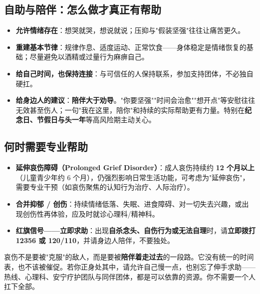 \subsection{自助与陪伴：怎么做才真正有帮助}

\begin{itemize}
	\item \textbf{允许情绪存在}：想哭就哭，想说就说；压抑与"假装坚强"往往让痛苦更久。
	\item \textbf{重建基本节律}：规律作息、适度运动、正常饮食——身体稳定是情绪恢复的基础；尽量避免以酒精或过量行为麻痹自己。
	\item \textbf{给自己时间，也保持连接}：与可信任的人保持联系，参加支持团体，不必独自硬扛。
	\item \textbf{给身边人的建议}：\textbf{陪伴大于劝导}。"你要坚强""时间会治愈""想开点"等安慰往往无效甚至伤人；一句"我在这里，陪你"和持续的实际帮助更有力量。特别在\textbf{纪念日、节假日与头一年}等高风险期主动关心。
\end{itemize}

\subsection{何时需要专业帮助}

\begin{itemize}
	\item \textbf{延伸哀伤障碍（Prolonged Grief Disorder）}：成人哀伤持续约 \textbf{12 个月以上}（儿童青少年约 6 个月），仍强烈影响日常生活功能，可考虑为"延伸哀伤"，需要专业干预（如哀伤聚焦的认知行为治疗、人际治疗）。
	\item \textbf{合并抑郁 / 创伤}：持续情绪低落、失眠、进食障碍、对一切失去兴趣，或出现创伤性再体验，应及时就诊心理科/精神科。
	\item \textbf{红旗信号——立即求助}：出现\textbf{自杀念头、自伤行为或无法自理}时，请\textbf{立即拨打 12356 或 120/110}，并请身边人陪伴，不要独处。
\end{itemize}

\begin{tcolorbox}[colback=purple!5!white,colframe=purple!55!black,title=贴心小叮咛]
哀伤不是要被"克服"的敌人，而是要被\textbf{陪伴着走过去}的一段路。它没有统一的时间表，也不该被催促。若你正身处其中，请允许自己慢一点，也别忘了伸手求助——热线、心理科、安宁疗护团队与同伴团体，都是可以依靠的资源。你不需要一个人扛下全部。
\end{tcolorbox}
